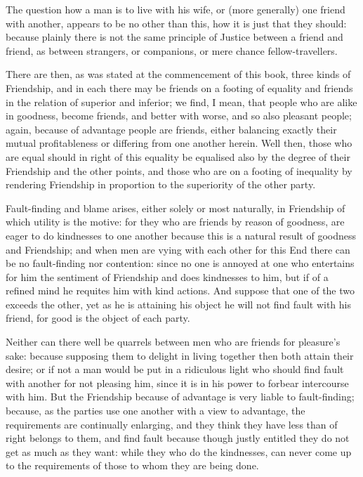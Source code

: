 The question how a man is to live with his wife, or (more generally) one friend
with another, appears to be no other than this, how it is just that they
should: because plainly there is not the same principle of Justice between a
friend and friend, as between strangers, or companions, or mere chance
fellow-travellers.


There are then, as was stated at the commencement of this book, three kinds of
Friendship, and in each there may be friends on a footing of equality and
friends in the relation of superior and inferior; we find, I mean, that people
who are alike in goodness, become friends, and better with worse, and so also
pleasant people; again, because of advantage people are friends, either
balancing exactly their mutual profitableness or differing from one another
herein. Well then, those who are equal should in right of this equality be
equalised also by the degree of their Friendship and the other points, and
those who are on a footing of inequality by rendering Friendship in proportion
to the superiority of the other party.

Fault-finding and blame arises, either solely or most naturally, in Friendship
of which utility is the motive: for they who are friends by reason of goodness,
are eager to do kindnesses to one another because this is a natural result of
goodness and Friendship; and when men are vying with each other for this End
there can be no fault-finding nor contention: since no one is annoyed at one
who entertains for him the sentiment of Friendship and does kindnesses to him,
but if of a refined mind he requites him with kind actions. And suppose that
one of the two exceeds the other, yet as he is attaining his object he will not
find fault with his friend, for good is the object of each party.

Neither can there well be quarrels between men who are friends for
pleasure’s sake: because supposing them to delight in living together
then both attain their desire; or if not a man would be put in a ridiculous
light who should find fault with another for not pleasing him, since it is in
his power to forbear intercourse with him. But the Friendship because of
advantage is very liable to fault-finding; because, as the parties use one
another with a view to advantage, the requirements are continually enlarging,
and they think they have less than of right belongs to them, and find fault
because though justly entitled they do not get as much as they want: while they
who do the kindnesses, can never come up to the requirements of those to whom
they are being done.

